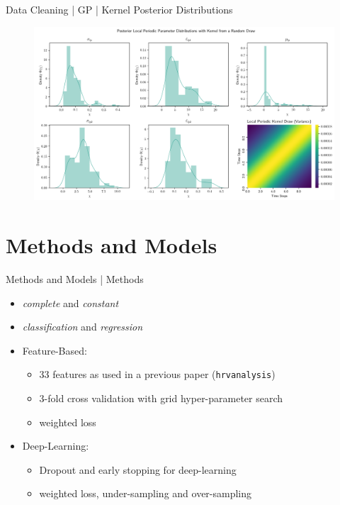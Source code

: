 \documentclass{beamer}
\begin{document}
        \begin{frame}{Data Cleaning | GP | Kernel Posterior Distributions}
        \begin{figure}[hbt]
        	\center
        	\includegraphics[width=1.0\textwidth]{img/gp_kernel_posterior_local_periodic_zoomed.png}
        	\label{fig:posterior_predictive_kernel_local_periodic_zoomed}
        \end{figure}
    \end{frame}
    
    \section{Methods and Models}
    \begin{frame}{Methods and Models | Methods}
        \begin{itemize}
            \item \textit{complete} and \textit{constant}
            \item \textit{classification} and \textit{regression}
            \item Feature-Based:
            \begin{itemize}
                \item 33 features as used in a previous paper (\texttt{hrvanalysis})
                \item 3-fold cross validation with grid hyper-parameter search
                \item weighted loss
            \end{itemize}
            \item Deep-Learning:
            \begin{itemize}
                \item Dropout and early stopping for deep-learning
                \item weighted loss, under-sampling and over-sampling
            \end{itemize}
        \end{itemize}
    \end{frame}
    
\end{document}
